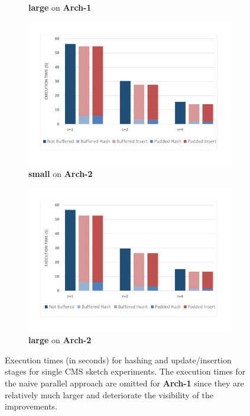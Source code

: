 \documentclass[10pt, conference, compsocconf]{IEEEtran}
\begin{document}
\begin{figure}[htbp]
\begin{subfigure}[t]{0.45\textwidth}
\caption{{\bf large} on {\bf Arch-1}}
\label{fig:8x2003arch1}
\end{subfigure}
\begin{subfigure}[t]{0.45\textwidth}
\includegraphics[width=\linewidth]{expfigs/8x211rasbpi.pdf}
\caption{{\bf small} on {\bf Arch-2}}
\label{fig:8x211arch2}
\end{subfigure}
\begin{subfigure}[t]{0.45\textwidth}\hspace*{2ex}
\includegraphics[width=\linewidth]{expfigs/8x2003rasbpi.pdf}
\caption{{\bf large} on {\bf Arch-2}}
\label{fig:8x2003arch2}
\end{subfigure}

\caption{Execution times (in seconds) for hashing and update/insertion stages for single CMS sketch experiments. The execution times for the naive parallel approach are omitted for {\bf Arch-1} since they are relatively much larger and deteriorate the visibility of the improvements.}
\label{fig:sum}
\end{figure}
\end{document}
